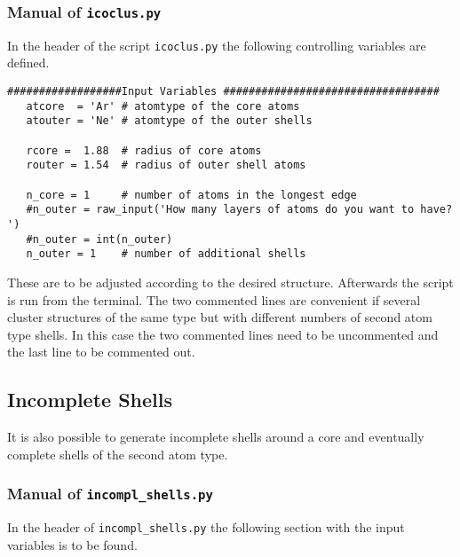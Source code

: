 \subsubsection{Manual of \lstinline|icoclus.py|}
In the header of the script \lstinline|icoclus.py| the following
controlling variables are defined.

\begin{lstlisting}
##################Input Variables ##################################
   atcore  = 'Ar' # atomtype of the core atoms
   atouter = 'Ne' # atomtype of the outer shells
   
   rcore =  1.88  # radius of core atoms
   router = 1.54  # radius of outer shell atoms
   
   n_core = 1     # number of atoms in the longest edge
   #n_outer = raw_input('How many layers of atoms do you want to have? ')
   #n_outer = int(n_outer)
   n_outer = 1    # number of additional shells
\end{lstlisting}

These are to be adjusted according to the desired structure.
Afterwards the script is run from the terminal.
The two commented lines are convenient if several cluster structures
of the same type but with different numbers of second atom type shells.
In this case the two commented lines need to be uncommented and the last
line to be commented out.

\subsection{Incomplete Shells}
It is also possible to generate incomplete shells around a core and
eventually complete shells of the second atom type.

\subsubsection{Manual of \lstinline|incompl_shells.py|}
In the header of \lstinline|incompl_shells.py| the following section
with the
input variables is to be found.


